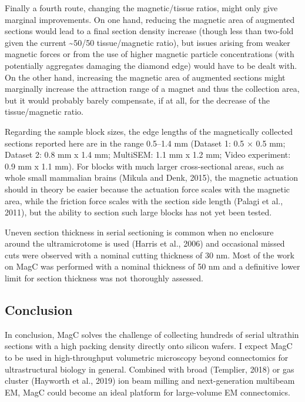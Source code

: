 \documentclass{article}
\begin{document}
Finally a fourth route, changing the magnetic/tissue ratios, might only give marginal improvements. On one hand, reducing the magnetic area of augmented sections would lead to a final section density increase (though less than two-fold given the current \textasciitilde50/50 tissue/magnetic ratio), but issues arising from weaker magnetic forces or from the use of higher magnetic particle concentrations (with potentially aggregates damaging the diamond edge) would have to be dealt with. On the other hand, increasing the magnetic area of augmented sections might marginally increase the attraction range of a magnet and thus the collection area, but it would probably barely compensate, if at all, for the decrease of the tissue/magnetic ratio.

Regarding the sample block sizes, the edge lengths of the magnetically collected sections reported here are in the range 0.5–1.4 mm (Dataset 1: 0.5 × 0.5 mm; Dataset 2: 0.8 mm x 1.4 mm; MultiSEM: 1.1 mm x 1.2 mm; Video experiment: 0.9 mm x 1.1 mm). For blocks with much larger cross-sectional areas, such as whole small mammalian brains (Mikula and Denk, 2015), the magnetic actuation should in theory be easier because the actuation force scales with the magnetic area, while the friction force scales with the section side length (Palagi et al., 2011), but the ability to section such large blocks has not yet been tested.

Uneven section thickness in serial sectioning is common when no enclosure around the ultramicrotome is used (Harris et al., 2006) and occasional missed cuts were observed with a nominal cutting thickness of 30 nm. Most of the work on MagC was performed with a nominal thickness of 50 nm and a definitive lower limit for section thickness was not thoroughly assessed.

\subsection*{Conclusion}

In conclusion, MagC solves the challenge of collecting hundreds of serial ultrathin sections with a high packing density directly onto silicon wafers. I expect MagC to be used in high-throughput volumetric microscopy beyond connectomics for ultrastructural biology in general. Combined with broad (Templier, 2018) or gas cluster (Hayworth et al., 2019) ion beam milling and next-generation multibeam EM, MagC could become an ideal platform for large-volume EM connectomics.
\end{document}

